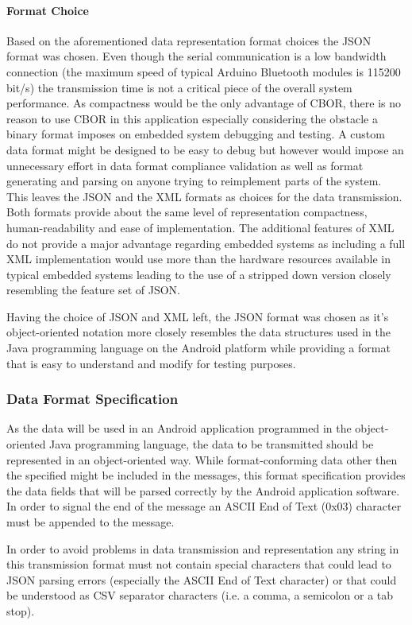 \paragraph{Format Choice}
Based on the aforementioned data representation format choices the JSON format was chosen. Even though the serial communication is a low bandwidth connection (the maximum speed of typical Arduino Bluetooth modules is 115200 bit/s) the transmission time is not a critical piece of the overall system performance. As compactness would be the only advantage of CBOR, there is no reason to use CBOR in this application especially considering the obstacle a binary format imposes on embedded system debugging and testing.  A custom data format might be designed to be easy to debug but however would impose an unnecessary effort in data format compliance validation as well as format generating and parsing on anyone trying to reimplement parts of the system. This leaves the JSON and the XML formats as choices for the data transmission. Both formats provide about the same level of representation compactness, human-readability and ease of implementation. The additional features of XML do not provide a major advantage regarding embedded systems as including a full XML implementation would use more than the hardware resources available in typical embedded systems leading to the use of a stripped down version closely resembling the feature set of JSON.

Having the choice of JSON and XML left, the JSON format was chosen as it's object-oriented notation more closely resembles the data structures used in the Java programming language on the Android platform while providing a format that is easy to understand and modify for testing purposes.

\subsubsection{Data Format Specification}
As the data will be used in an Android application programmed in the object-oriented Java programming language, the data to be transmitted should be represented in an object-oriented way. While format-conforming data other then the specified might be included in the messages, this format specification provides the data fields that will be parsed correctly by the Android application software. In order to signal the end of the message an ASCII End of Text (0x03) character must be appended to the message.

In order to avoid problems in data transmission and representation any string in this transmission format must not contain special characters that could lead to JSON parsing errors (especially the ASCII End of Text character) or that could be understood as CSV separator characters (i.e. a comma, a semicolon or a tab stop).

